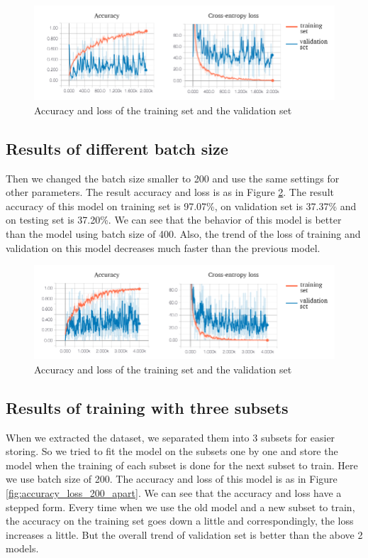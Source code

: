 \documentclass{article}
\begin{document}
\begin{figure}[h!]
\centering
\includegraphics[width=\textwidth]{accuracy_loss_400.png}
\caption{Accuracy and loss of the training set and the validation set}
\label{fig:accuracy_loss_400}
\end{figure}

\subsection{Results of different batch size}

Then we changed the batch size smaller to 200 and use the same settings for other parameters. The result accuracy and loss is as in Figure \ref{fig:accuracy_loss_200}. The result accuracy of this model on training set is 97.07\%, on validation set is 37.37\% and on testing set is 37.20\%. We can see that the behavior of this model is better than the model using batch size of 400. Also, the trend of the loss of training and validation on this model decreases much faster than the previous model.

\begin{figure}[h!]
\centering
\includegraphics[width=\textwidth]{accuracy_loss_200.png}
\caption{Accuracy and loss of the training set and the validation set}
\label{fig:accuracy_loss_200}
\end{figure}

\subsection{Results of training with three subsets}

When we extracted the dataset, we separated them into 3 subsets for easier storing. So we tried to fit the model on the subsets one by one and store the model when the training of each subset is done for the next subset to train. Here we use batch size of 200. The accuracy and loss of this model is as in Figure \ref{fig:accuracy_loss_200_apart}. We can see that the accuracy and loss have a stepped form. Every time when we use the old model and a new subset to train, the accuracy on the training set goes down a little and correspondingly, the loss increases a little. But the overall trend of validation set is better than the above 2 models.
\end{document}
